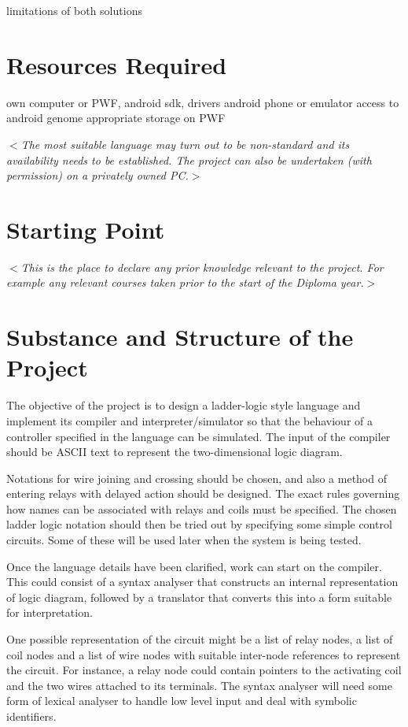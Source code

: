 \documentclass[12pt]{article}
\newcommand{\al}{$<$}
\newcommand{\ar}{$>$}
\begin{document}
limitations of both solutions



\section*{Resources Required}

own computer or PWF, android sdk, drivers
android phone or emulator
access to android genome
appropriate storage on PWF

\al\emph{The most suitable language may turn out to be non-standard and
  its availability needs to be established.  The project can also be
  undertaken (with permission) on a privately owned PC.}\ar


\section*{Starting Point}

\al\emph{This is the place to declare any prior knowledge relevant to
  the project.  For example any relevant courses taken prior to the
  start of the Diploma year.}\ar


\section*{Substance and Structure of the Project}

The objective of the project is to design a ladder-logic style
language and implement its compiler and interpreter/simulator so that
the behaviour of a controller specified in the language can be
simulated.  The input of the compiler should be ASCII text to
represent the two-dimensional logic diagram.
 
Notations for wire joining and crossing should be chosen, and also a
method of entering relays with delayed action should be designed. The
exact rules governing how names can be associated with relays and
coils must be specified. The chosen ladder logic notation should then
be tried out by specifying some simple control circuits. Some of these
will be used later when the system is being tested.

Once the language details have been clarified, work can start on the
compiler.  This could consist of a syntax analyser that constructs an
internal representation of logic diagram, followed by a translator
that converts this into a form suitable for interpretation.

One possible representation of the circuit might be a list of relay
nodes, a list of coil nodes and a list of wire nodes with suitable
inter-node references to represent the circuit. For instance, a relay
node could contain pointers to the activating coil and the two wires
attached to its terminals. The syntax analyser will need some form of
lexical analyser to handle low level input and deal with symbolic
identifiers.
\end{document}
